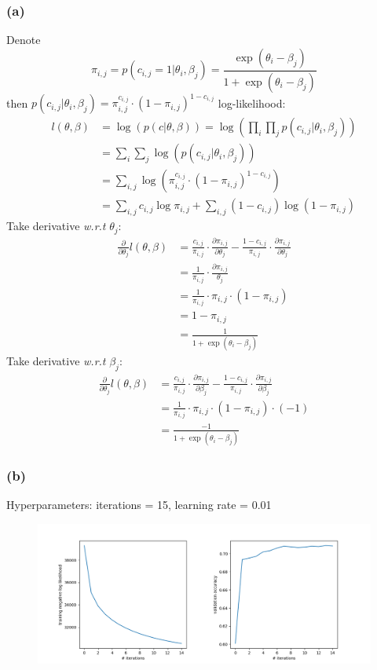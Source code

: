 \documentclass{article}
\newcommand{\pardev}[1]{\frac{\partial}{\partial #1}}
\begin{document}
\begin{spacing}{1.5}
\subsubsection*{(a)}
Denote $$\pi_{i,j} = p(c_{i,j} = 1 | \theta_i, \beta_j) = \frac{\exp(\theta_i - \beta_j)}{1+\exp(\theta_i - \beta_j)}$$ then $p(c_{i,j} | \theta_i, \beta_j) = \pi_{i,j}^{c_{i,j}}\cdot (1-\pi_{i,j})^{1-c_{i,j}}$
log-likelihood: 
\begin{align*}
	l(\theta, \beta) &= \log (p(c| \theta, \beta)) = \log (\prod_i \prod_j p(c_{i,j} | \theta_i, \beta_j))\\
	&= \sum_i \sum_j \log(p(c_{i,j} | \theta_i, \beta_j))\\
	&= \sum_{i,j} \log(\pi_{i,j}^{c_{i,j}}\cdot (1-\pi_{i,j})^{1-c_{i,j}} ) \\
	&= \sum_{i,j} c_{i,j} \log \pi_{i,j} + \sum_{i,j}(1-c_{i,j})\log(1-\pi_{i,j})
\end{align*}
Take derivative \textit{w.r.t} $\theta_j$:
\begin{align*}
	\pardev{\theta_j}l(\theta, \beta) &= \frac{c_{i,j}}{\pi_{i,j}}\cdot\frac{\partial \pi_{i,j}}{\partial \theta_j} - \frac{1-c_{i,j}}{\pi_{i,j}}\cdot\frac{\partial \pi_{i,j}}{\partial \theta_j}\\
	& = \frac{1}{\pi_{i,j}}\cdot\frac{\partial \pi_{i,j}}{\theta_j}\\
	& = \frac{1}{\pi_{i,j}}\cdot \pi_{i,j} \cdot (1-\pi_{i,j})\\
	& = 1- \pi_{i,j} \\ 
	& = \frac{1}{1+\exp(\theta_i- \beta_j)}
\end{align*}
Take derivative \textit{w.r.t} $\beta_j$:
\begin{align*}
	\pardev{\theta_j}l(\theta, \beta) &= \frac{c_{i,j}}{\pi_{i,j}}\cdot\frac{\partial \pi_{i,j}}{\partial \beta_j} - \frac{1-c_{i,j}}{\pi_{i,j}}\cdot\frac{\partial \pi_{i,j}}{\partial \beta_j}\\
	& = \frac{1}{\pi_{i,j}}\cdot \pi_{i,j} \cdot (1-\pi_{i,j})\cdot(-1)\\
	& = \frac{-1}{1+\exp(\theta_i-\beta_j)}
\end{align*}
\subsubsection*{(b)}
Hyperparameters: iterations = 15, learning rate = 0.01
\begin{figure}[htbp]
	\centering
	\includegraphics[width=1.1\textwidth]{irt_neg_lld_and_acc.png}
\end{figure}

\end{spacing}
\end{document}
